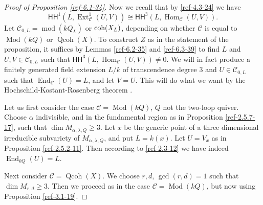 \documentclass{amsart}
\numberwithin{equation}{section}
\let\cal\mathcal
\theoremstyle{definition}
\theoremstyle{remark}
\begin{document}
\begin{proof}[Proof of Proposition \ref{ref-6.1-34}]
Now we recall that by \eqref{ref-4.3-24} we have
\[
{\mathsf{HH}}^1(L,{\operatorname {Ext}}^1_{{\cal C}}(U,V))\cong {\mathsf{HH}}^{3}(L,{\operatorname {Hom}}_{{\cal C}}(U,V)).
\]
Let ${{\cal C}}_{0,L}={\operatorname{mod}}(kQ_L)$ or ${\mathop{\text{\upshape{coh}}}}(X_L)$, depending on whether ${{\cal C}}$ is equal to ${\operatorname{Mod}}(kQ)$ or ${\operatorname{Qcoh}}(X)$.
To construct $Z$ as in the statement of the proposition, it suffices by Lemmas \ref{ref-6.2-35}
and \ref{ref-6.3-39}
to find $L$ and $U,V\in {{\cal C}}_{0,L}$ such that
${\mathsf{HH}}^3(L,{\operatorname {Hom}}_{{\cal C}}(U,V))\neq 0$. We will in fact produce a finitely generated field extension $L/k$
of transcendence degree $3$ and $U\in {{\cal C}}_{0,L}$ such that ${\operatorname {End}}_{{\cal C}}(U)=L$, and let $V=U$.
This will do what
we want by the Hochschild-Kostant-Rosenberg theorem \cite{HKR}.

Let us first consider the case ${{\cal C}}={\operatorname{Mod}}(kQ)$, $Q$ not the two-loop quiver.
  Choose $\alpha$ indivisible, and in the fundamental region as
in Proposition \ref{ref-2.5.7-17}, such that $\dim M_{\alpha,\lambda,Q}\ge 3$. Let $x$ be the generic point of
a three dimensional irreducible subvariety of $M_{\alpha,\lambda,Q}$, and put $L=k(x)$. Let $U=V_x$ as in Proposition \ref{ref-2.5.2-11}. 
Then according to \eqref{ref-2.3-12} we have indeed ${\operatorname {End}}_{kQ}(U)=L$.

Next consider ${{\cal C}}={\operatorname{Qcoh}}(X)$. We choose $r,d$, $\gcd(r,d)=1$ such that $\dim M_{r,d}\ge 3$. Then
we proceed as in the case ${{\cal C}}={\operatorname{Mod}}(kQ)$, but now using Proposition \ref{ref-3.1-19}.
\end{proof}
\end{document}
